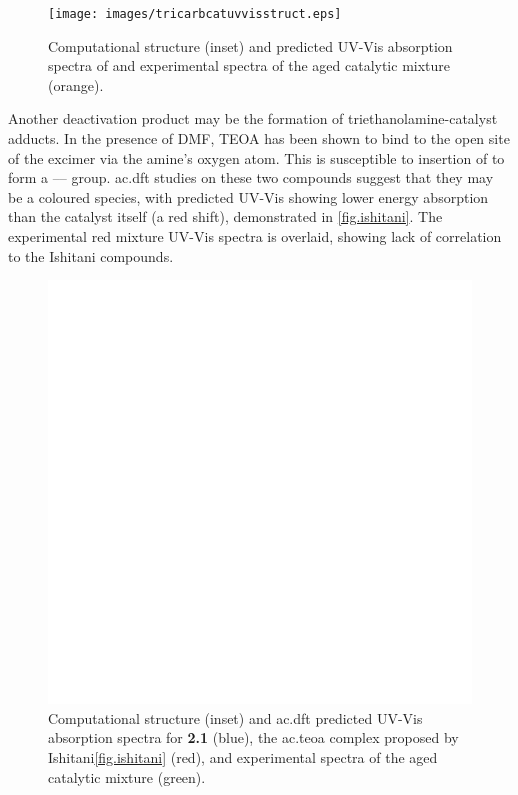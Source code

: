 \begin{figure}[!htbp]
 \begin{center}
  \texttt{[image: images/tricarbcatuvvisstruct.eps]}
 \end{center}
 \caption[Structure and absorption spectra of proposed ]{Computational structure (inset) and predicted UV-Vis absorption spectra of  and experimental spectra of the aged catalytic mixture (orange).}
 \label{fig.uvvistricarb}
\end{figure}

Another deactivation product may be the formation of triethanolamine-catalyst adducts\autocite{morimoto2013}. In the presence of DMF, TEOA has been shown to bind to the open site of the excimer via the amine's oxygen atom. This is susceptible to insertion of  to form a ---- group. \Gls{ac.dft} studies on these two compounds suggest that they may be a coloured species, with predicted UV-Vis showing lower energy absorption than the catalyst itself (a red shift), demonstrated in \autoref{fig.ishitani}. The experimental red mixture UV-Vis spectra is overlaid, showing lack of correlation to the Ishitani compounds.

\begin{figure}[!htbp]
 \begin{center}
  \includegraphics[clip=true, keepaspectratio, width=120mm]{images/ishitani.eps}
 \end{center}
\caption[Structure and absorption spectra of the catalyst-TEOA complex]{Computational structure (inset) and \gls{ac.dft} predicted UV-Vis absorption spectra for \textbf{2.1} (blue), the \gls{ac.teoa} complex proposed by Ishitani\autoref{fig.ishitani} (red), and experimental spectra of the aged catalytic mixture (green).}
\label{fig.ishitani}
\end{figure}

